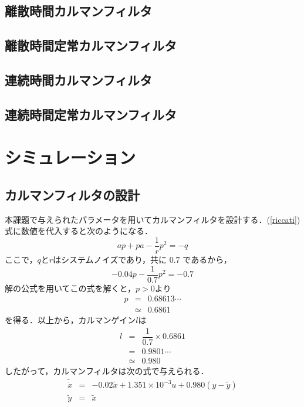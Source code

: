 \documentclass[a4paper,12pt]{jarticle}
\begin{document}
\subsection{離散時間カルマンフィルタ}
\subsection{離散時間定常カルマンフィルタ}
\subsection{連続時間カルマンフィルタ}
\subsection{連続時間定常カルマンフィルタ}

\section{シミュレーション}


\subsection{カルマンフィルタの設計}
%
本課題で与えられたパラメータを用いてカルマンフィルタを設計する．(\ref{riccati})式に数値を代入すると次のようになる．
%
\begin{equation}
 ap + pa - \dfrac{1}{r}p^2 = -q
\end{equation}
%
ここで，$ q $と$ r $はシステムノイズであり，共に 0.7 であるから，
%
\begin{equation}
 -0.04p - \dfrac{1}{0.7}p^2 = -0.7
\end{equation}
%
解の公式を用いてこの式を解くと，$ p > 0 $より
%
\begin{eqnarray}
 p & = & 0.68613 \cdots \nonumber \\
   & \simeq & 0.6861
\end{eqnarray}
%
を得る．以上から，カルマンゲイン$ l $は
%
\begin{eqnarray}
 l & = & \dfrac{1}{0.7} \times 0.6861 \\
   & = & 0.9801 \cdots\\
   & \simeq & 0.980
\end{eqnarray}
%
したがって，カルマンフィルタは次の式で与えられる．
%
\begin{equation}
 \begin{array}{rcl}
  \tilde{\dot{x}} & = &  -0.02 \tilde{x} + 1.351 \times 10^{-3} u + 0.980 ( y - \tilde{y} ) \\
  \tilde{y} & = & \tilde{x}
 \end{array}
\end{equation}
%
\end{document}
